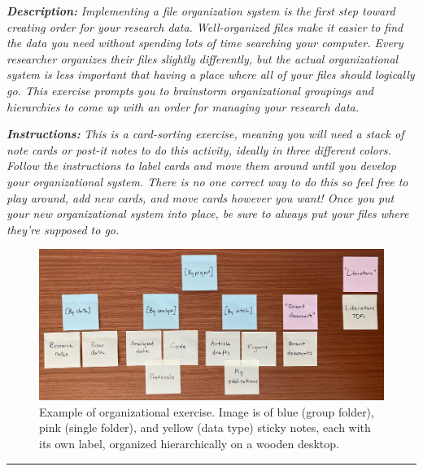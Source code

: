 \documentclass[
]{book}
\begin{document}
\textbf{\emph{Description:}} \emph{Implementing a file organization system is the first step toward creating order for your research data. Well-organized files make it easier to find the data you need without spending lots of time searching your computer. Every researcher organizes their files slightly differently, but the actual organizational system is less important that having a place where all of your files should logically go. This exercise prompts you to brainstorm organizational groupings and hierarchies to come up with an order for managing your research data.}

\textbf{\emph{Instructions:}} \emph{This is a card-sorting exercise, meaning you will need a stack of note cards or post-it notes to do this activity, ideally in three different colors. Follow the instructions to label cards and move them around until you develop your organizational system. There is no one correct way to do this so feel free to play around, add new cards, and move cards however you want! Once you put your new organizational system into place, be sure to always put your files where they're supposed to go.}

\begin{figure}
\centering
\includegraphics{images/03_CardSorting.jpg}
\caption{Example of organizational exercise. Image is of blue (group folder), pink (single folder), and yellow (data type) sticky notes, each with its own label, organized hierarchically on a wooden desktop.}
\end{figure}

\begin{center}\rule{0.5\linewidth}{0.5pt}\end{center}
\end{document}
